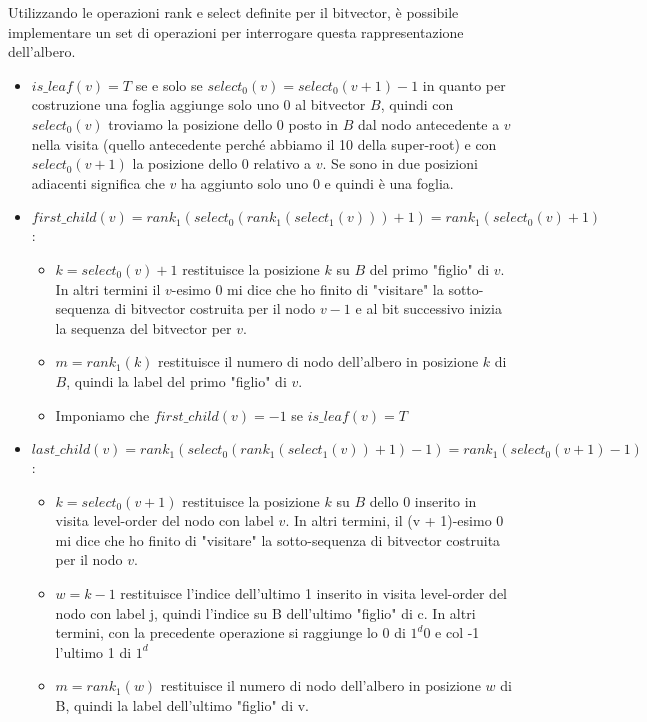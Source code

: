 Utilizzando le operazioni rank e select definite per il bitvector, è possibile implementare un set di operazioni per interrogare questa rappresentazione dell'albero.
\begin{itemize}
    \item $is\_leaf(v) = T$ se e solo se $select_0(v) = select_0(v + 1) - 1$ in quanto per costruzione una foglia aggiunge solo uno 0 al bitvector $B$, quindi con $select_0(v)$ troviamo la posizione dello 0 posto in $B$ dal nodo antecedente a $v$ nella visita (quello antecedente perché abbiamo il 10 della super-root) e con $select_0(v + 1)$ la posizione dello 0 relativo a $v$. Se sono in due posizioni adiacenti significa che $v$ ha aggiunto solo uno $0$ e quindi è una foglia.
    \item $first\_child(v) = rank_1(select_0(rank_1(select_1(v)))+1) = rank_1(select_0(v)+1)$:
    \begin{itemize}
        \item $k = select_0(v) + 1$ restituisce la posizione $k$ su $B$ del primo "figlio" di $v$. In altri termini il $v$-esimo 0 mi dice che ho finito di "visitare" la sotto-sequenza di bitvector costruita per il nodo $v - 1$ e al bit successivo inizia la sequenza del bitvector per $v$.
        \item $m = rank_1(k)$ restituisce il numero di nodo dell'albero in posizione $k$ di $B$, quindi la label del primo "figlio" di $v$.
        \item Imponiamo che $first\_child(v) = - 1$ se $is\_leaf (v) = T$
    \end{itemize}
    \item $last\_child(v) = rank_1(select_0(rank_1(select_1(v))+1)-1) = rank_1(select_0(v+1)-1)$:
    \begin{itemize}
        \item $k = select_0(v + 1)$ restituisce la posizione $k$ su $B$ dello $0$ inserito in visita level-order del nodo con label $v$. In altri termini, il (v + 1)-esimo 0 mi dice che ho finito di "visitare" la sotto-sequenza di bitvector costruita per il nodo $v$.
        \item $w = k - 1$ restituisce l'indice dell'ultimo 1 inserito in visita level-order del nodo con label j, quindi l'indice su B dell'ultimo "figlio" di c. In altri termini, con la precedente operazione si raggiunge lo 0 di $1^d 0$ e col -1 l'ultimo 1 di $1^d$
        \item $m = rank_1(w)$ restituisce il numero di nodo dell'albero in posizione $w$ di B, quindi la label dell'ultimo "figlio" di v.

\end{itemize}
\end{itemize}
